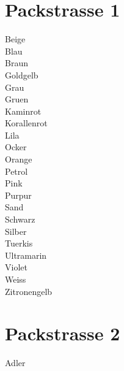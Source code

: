 \documentclass{article}
\begin{document}
\centering

\newpage
\section{Packstrasse 1}

Beige
\\

Blau
\\


Braun
\\


Goldgelb
\\


Grau
\\


Gruen
\\


Kaminrot
\\


Korallenrot
\\


Lila
\\


Ocker
\\


Orange
\\


Petrol
\\


Pink
\\


Purpur
\\


Sand
\\


Schwarz
\\


Silber
\\


Tuerkis
\\


Ultramarin
\\


Violet
\\


Weiss
\\


Zitronengelb
\\

\newpage
\section{Packstrasse 2}


Adler
\\
\end{document}
